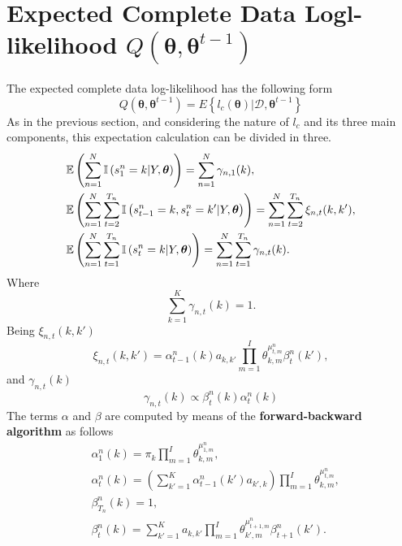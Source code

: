 \documentclass[12pt]{article}
\newcommand{\indicator}{\mathbb{I}}
\newcommand{\bs}{\boldsymbol}
\begin{document}
\section{Expected Complete Data Logl-likelihood $Q \left( \boldsymbol { \theta } , \boldsymbol { \theta } ^ { t - 1 } \right)$}
The expected complete data log-likelihood has the following form
\begin{equation}
Q \left( \boldsymbol { \theta } , \boldsymbol { \theta } ^ { t - 1 } \right) = E \left\{ l _ { c } ( \boldsymbol { \theta } ) | \mathcal { D } , \boldsymbol { \theta } ^ { t - 1 } \right\}
\end{equation}
As in the previous section, and considering the nature of $l_{c}$ and its three main components, this expectation calculation can be divided in three.
\begin{align}
& \expectation \left( \sum _ { n = 1 } ^ { N } \indicator \left( s _ { 1 } ^ { n } = k | Y , \bs\theta \right) \right) = \sum _ { n = 1 } ^ { N } \gamma _ { n , 1 } ( k ), \\
& \expectation \left( \sum _ { n = 1 } ^ { N } \sum _ { t = 2 } ^ { T _ { n } } \indicator \left( s _ { t - 1 } ^ { n } = k , s _ { t } ^ { n } = k' | Y , \bs\theta \right) \right) = \sum _ { n = 1 } ^ { N } \sum _ { t = 2 } ^ { T _ { n } } \xi _ { n , t } ( k , k' ), \\
& \expectation \left( \sum _ { n = 1 } ^ { N } \sum _ { t = 1 } ^ { T _ { n } } \indicator \left( s _ { t } ^ { n } = k | Y , \bs\theta \right) \right) = \sum _ { n = 1 } ^ { N } \sum _ { t = 1 } ^ { T _ { n } } \gamma _ { n , t } ( k ).
\end{align}
Where 
\begin{equation}
\sum _ { k = 1 } ^ { K } \gamma _ { n , t } ( k ) = 1.
\end{equation}
\noindent Being $\xi _ { n,t } ( k , k' )$ 
\begin{equation}
\xi _ { n,t } ( k , k' ) = \alpha _ { t-1 }^{n} ( k ) a _ { k,k' } \prod\limits_{m=1}^{I} \theta_{k,m}^{\mu^{n}_{t,m}} \beta _ { t }^{n} ( k' ),
\end{equation}
and $ \gamma _ { n , t } ( k ) $
\begin{equation}\label{eq:gamma}
\gamma _ { n , t } ( k )\propto \beta _ { t }^{n} ( k )\alpha _ { t }^{n} ( k )
\end{equation}
The terms $\alpha$ and $\beta$ are computed by means of the \textbf{forward-backward algorithm }as follows
\begin{align}
\label{alfabeta}
&\alpha _ { 1 }^{n} ( k ) = \pi _ { k } \prod\limits_{m=1}^{I}\theta_{k,m}^{\mu^{n}_{1,m}}, \\
&\alpha _ { t }^{n} ( k ) = \left( \sum _ { k' = 1 } ^ { K } \alpha _ { t - 1 }^{n} ( k' ) a _ { k',k } \right) \prod\limits_{m=1}^{I}\theta_{k,m}^{\mu^{n}_{t,m}}, \\
&\beta _ { T_{n} }^{n} ( k ) = 1, \\
& \beta _ { t }^{n} ( k ) = \sum _ {k' = 1 } ^ { K } a _ { k,k'}  \prod\limits_{m=1}^{I}\theta_{k',m}^{\mu^{n}_{t+1,m}}  \beta _ { t + 1 }^{n} ( k' ).
\end{align}
\end{document}

